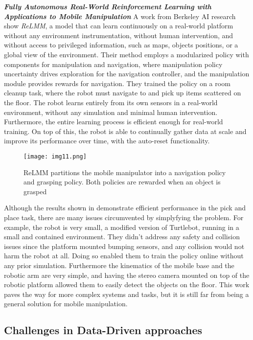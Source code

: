 \textbf{\textit{Fully Autonomous Real-World Reinforcement
		Learning with Applications to Mobile Manipulation}} \quad
A work from Berkeley AI research \cite{sun2022relmm} show \textit{ReLMM}, a model that
can learn continuously on a real-world platform without any environment instrumentation,
without human intervention, and without access to privileged information, such as maps,
objects positions, or a global view of the environment. Their method employs a
modularized policy with components for manipulation and navigation, where manipulation
policy uncertainty drives exploration for the navigation controller, and the manipulation
module provides rewards for navigation. They trained the policy on a room cleanup task, where
the robot must navigate to and pick up items scattered on the floor.
The robot learns entirely from its own sensors in a real-world environment, without any
simulation and minimal human intervention. Furthermore, the entire learning process is efficient
enough for real-world training. On top of this, the robot is able to continually gather data
at scale and improve its performance over time, with the auto-reset functionality.

\begin{figure}[H]
	\centering
	\texttt{[image: img11.png]}
	\captionsetup{width=1\linewidth}
	\caption{ReLMM partitions the mobile manipulator into a navigation policy
		and grasping policy. Both policies are rewarded when an object is grasped
		\cite{sun2022relmm}}
	\label{fig:img11}
\end{figure}

Although the results shown in \cite{sun2022relmm} demonstrate efficient performance in
the pick and place task, there are many issues circumvented by simplyfying the problem.
For example, the robot is very small, a modified version of Turtlebot, running in a small and
contained environment. They didn't address any safety and collision issues since the platform
mounted bumping sensors, and any collision would not harm the robot at all. Doing so enabled them
to train the policy online without any prior simulation.
Furthermore the kinematics of the mobile base and the robotic arm are very simple, and having the
stereo camera mounted on top of the robotic platform allowed them to easily detect the objects
on the floor. This work paves the way for more complex systems and tasks, but it is still far
from being a general solution for mobile manipulation.

\subsection{Challenges in Data-Driven approaches}

